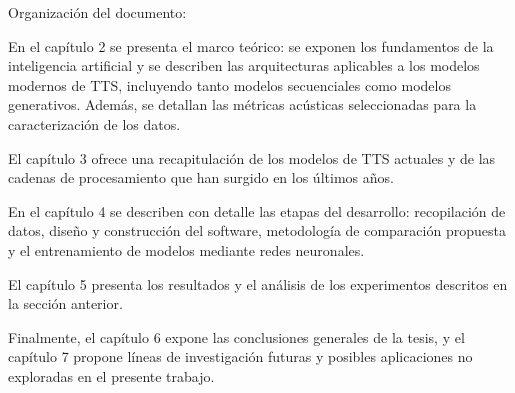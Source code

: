 Organización del documento:

En el capítulo 2 se presenta el marco teórico: se exponen los fundamentos de la inteligencia artificial y se describen las arquitecturas aplicables a los modelos modernos de TTS, incluyendo tanto modelos secuenciales como modelos generativos. Además, se detallan las métricas acústicas seleccionadas para la caracterización de los datos.

El capítulo 3 ofrece una recapitulación de los modelos de TTS actuales y de las cadenas de procesamiento que han surgido en los últimos años.

En el capítulo 4 se describen con detalle las etapas del desarrollo: recopilación de datos, diseño y construcción del software, metodología de comparación propuesta y el entrenamiento de modelos mediante redes neuronales.

El capítulo 5 presenta los resultados y el análisis de los experimentos descritos en la sección anterior.

Finalmente, el capítulo 6 expone las conclusiones generales de la tesis, y el capítulo 7 propone líneas de investigación futuras y posibles aplicaciones no exploradas en el presente trabajo.